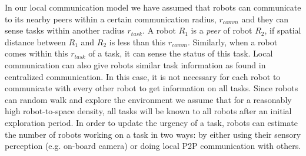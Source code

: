 \documentclass[journal]{IEEEtran}
\begin{document}
In our local communication model we have assumed that robots can communicate to its nearby peers within a certain communication radius, $r_{comm}$ and they can sense tasks within another radius $r_{task}$. %
A robot $R_1$ is a {\em peer} of robot $R_2$, if spatial distance between $R_1$ and $R_2$ is less than this $r_{comm}$.
Similarly, when a robot comes within this $r_{task}$ of a task, it can sense the status of this task. 
Local communication can also give robots similar task information as found in centralized communication. In this case, it is not necessary for each robot to communicate with every other robot to get information on all tasks. Since robots can random walk and explore the environment we assume that for a reasonably high robot-to-space density, all tasks will be known to all robots after an initial exploration period. In order to update the urgency of a task, robots can estimate the number of robots working on a task in two ways:  by either using their sensory perception (e.g. on-board camera) or  doing local P2P communication with others.
\end{document}
